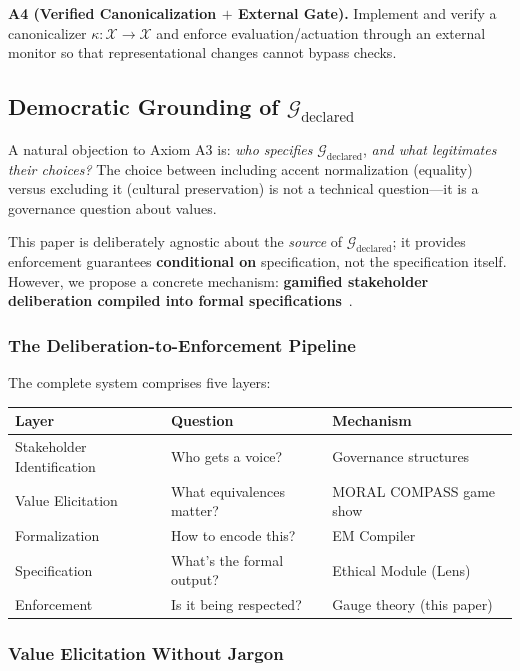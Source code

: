 \documentclass[12pt]{article}
\begin{document}
\textbf{A4 (Verified Canonicalization $+$ External Gate).} Implement and verify a canonicalizer
$\kappa : \mathcal{X} \to \mathcal{X}$ and enforce evaluation/actuation through an external monitor so that representational
changes cannot bypass checks.

\subsection{Democratic Grounding of $\mathcal{G}_{\text{declared}}$}

A natural objection to Axiom A3 is: \emph{who specifies} $\mathcal{G}_{\text{declared}}$, \emph{and what legitimates their choices?} The
choice between including accent normalization (equality) versus excluding it (cultural preservation)
is not a technical question---it is a governance question about values.

This paper is deliberately agnostic about the \emph{source} of $\mathcal{G}_{\text{declared}}$; it provides enforcement guarantees \textbf{conditional on} specification, not the specification itself. However, we propose a concrete
mechanism: \textbf{gamified stakeholder deliberation compiled into formal specifications}~\cite{bond2025compass}.

\subsubsection{The Deliberation-to-Enforcement Pipeline}

The complete system comprises five layers:

\begin{table}[h]
\centering
\begin{tabular}{lll}
\toprule
\textbf{Layer} & \textbf{Question} & \textbf{Mechanism} \\
\midrule
Stakeholder Identification & Who gets a voice? & Governance structures \\
Value Elicitation & What equivalences matter? & MORAL COMPASS game show \\
Formalization & How to encode this? & EM Compiler \\
Specification & What's the formal output? & Ethical Module (Lens) \\
Enforcement & Is it being respected? & Gauge theory (this paper) \\
\bottomrule
\end{tabular}
\end{table}

\subsubsection{Value Elicitation Without Jargon}
\end{document}
